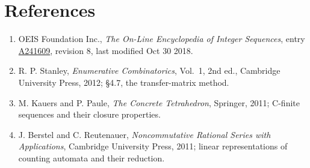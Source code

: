 \documentclass[11pt]{article}
\theoremstyle{definition}
\begin{document}
\section{References}

\begin{enumerate}

\item OEIS Foundation Inc., \emph{The On-Line Encyclopedia of Integer Sequences}, entry \href{https://oeis.org/A241609}{A241609}, revision 8, last modified Oct 30 2018.

\item R. P. Stanley, \emph{Enumerative Combinatorics}, Vol.~1, 2nd ed., Cambridge University Press, 2012; \S4.7, the transfer-matrix method.

\item M. Kauers and P. Paule, \emph{The Concrete Tetrahedron}, Springer, 2011; C-finite sequences and their closure properties.

\item J. Berstel and C. Reutenauer, \emph{Noncommutative Rational Series with Applications}, Cambridge University Press, 2011; linear representations of counting automata and their reduction.

\end{enumerate}
\end{document}
